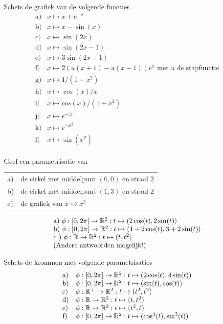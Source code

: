 \documentclass{ximera}
\begin{document}
\begin{oefening2}
Schets de grafiek van de volgende functies.
\[
\begin{array}{ll}
\mbox{a)} & x\mapsto x+e^{-x}\\
\mbox{b)} & x\mapsto x-\sin(x)\\
\mbox{c)} & x\mapsto \sin(2x)\\
\mbox{d)} & x\mapsto \sin(2x-1)\\
\mbox{e)} & x\mapsto 3\sin(2x-1)\\
\mbox{f)} & x\mapsto 2(u(x+1)-u(x-1))e^x \mbox{ met $u$ de
  stapfunctie}\\
\mbox{g)} & x\mapsto 1/(1+x^2)\\
\mbox{h)} & x\mapsto \cos(x)/x\\
\mbox{i)} & x\mapsto cos(x)/(1+x^2)\\
\mbox{j)} & x\mapsto e^{-|x|}\\
\mbox{k)} & x\mapsto e^{-x^2}\\
\mbox{l)} & x\mapsto \sin(x^2)\\
\end{array}
\]
\end{oefening2}

\begin{oefening2}
Geef een parametrisatie van\\
\begin{tabular}{ll}
a) & de cirkel met middelpunt $(0,0)$ en straal $2$\\
b) & de cirkel met middelpunt $(1,3)$ en straal $2$\\
c) & de grafiek van $x\mapsto x^2$
\end{tabular}

\begin{opl}
\[
\ba{l}
\mbox{a)~} \phi: [0,2\pi] \rightarrow \R^2: t\mapsto
(2\cos(t),2\sin(t))\\
\mbox{b)~} \phi: [0,2\pi] \rightarrow \R^2: t\mapsto
(1+2\cos(t),3+2\sin(t))\\
\mbox{c~)~} \phi: \R \rightarrow \R^2: t\mapsto
(t,t^2)\\
\mbox{(Andere antwoorden mogelijk!)}
\ea
\]
\end{opl}

\end{oefening2}

\begin{oefening2}
Schets de krommen met volgende parametrisaties
\[
\begin{array}{ll}
\mbox{a)} & \phi: [0,2\pi] \rightarrow \R^2: t\mapsto (2\cos(t),4\sin(t))\\
\mbox{b)} & \phi: [0,2\pi] \rightarrow \R^2: t\mapsto (\sin(t),\cos(t))\\
\mbox{c)} & \phi: \R^+ \rightarrow \R^2: t\mapsto (t^2,t^2)\\
\mbox{d)} & \phi: \R \rightarrow \R^2: t\mapsto (t,t^2)\\
\mbox{e)} & \phi: \R \rightarrow \R^2: t\mapsto (t^2,t)\\
\mbox{f)} & \phi: [0,2\pi] \rightarrow \R^2: t\mapsto (\cos^3(t),\sin^3(t))\\
\end{array}
\]
\end{oefening2}
\end{document}
